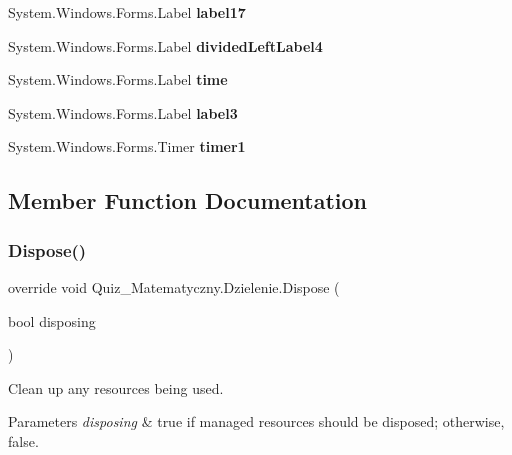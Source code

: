 \begin{DoxyCompactItemize}
System.\+Windows.\+Forms.\+Label {\bfseries label17}
\item 
\mbox{\label{class_quiz___matematyczny_1_1_dzielenie_a1c11d2361ef3ada38e34aba61616c26c}} 
System.\+Windows.\+Forms.\+Label {\bfseries divided\+Left\+Label4}
\item 
\mbox{\label{class_quiz___matematyczny_1_1_dzielenie_accd73e966e8110efb449a17a080770a5}} 
System.\+Windows.\+Forms.\+Label {\bfseries time}
\item 
\mbox{\label{class_quiz___matematyczny_1_1_dzielenie_a299d64f29245e26afb6f11a95a86796f}} 
System.\+Windows.\+Forms.\+Label {\bfseries label3}
\item 
\mbox{\label{class_quiz___matematyczny_1_1_dzielenie_a01ef316fa12bde0bc7fb9bef6609d4f9}} 
System.\+Windows.\+Forms.\+Timer {\bfseries timer1}
\end{DoxyCompactItemize}


\subsection{Member Function Documentation}
\mbox{\label{class_quiz___matematyczny_1_1_dzielenie_a80ea648f1e76f20efda57b1d6f015a60}} 
\subsubsection{\texorpdfstring{Dispose()}{Dispose()}}
{\footnotesize\ttfamily override void Quiz\+\_\+\+Matematyczny.\+Dzielenie.\+Dispose (\begin{DoxyParamCaption}\item[{bool}]{disposing }\end{DoxyParamCaption})\hspace{0.3cm}{\ttfamily [protected]}}



Clean up any resources being used. 


\begin{DoxyParams}{Parameters}
{\em disposing} & true if managed resources should be disposed; otherwise, false.\\
\hline
\end{DoxyParams}
\mbox{\label{class_quiz___matematyczny_1_1_dzielenie_a0e6543874fa8d3f296f8b099cf395f99}} 
